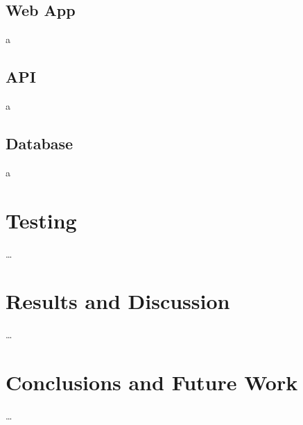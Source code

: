 \documentclass[11pt,openright,a4paper]{report}
\begin{document}
\section{Web App}
a

\section{API} \label{sec:apiimpl}
a

\section{Database}
a

\chapter{Testing}

\ldots


\chapter{Results and Discussion}

\ldots


\chapter{Conclusions and Future Work}

\ldots

\printbibliography
\end{document}

